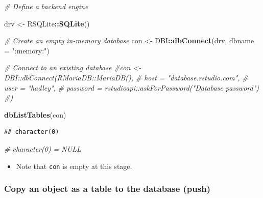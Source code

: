 \documentclass[
]{book}
\newenvironment{Shaded}{\begin{snugshade}}{\end{snugshade}}
\newcommand{\AttributeTok}[1]{\textcolor[rgb]{0.13,0.29,0.53}{#1}}
\newcommand{\CommentTok}[1]{\textcolor[rgb]{0.56,0.35,0.01}{\textit{#1}}}
\newcommand{\FunctionTok}[1]{\textcolor[rgb]{0.13,0.29,0.53}{\textbf{#1}}}
\newcommand{\NormalTok}[1]{#1}
\newcommand{\OtherTok}[1]{\textcolor[rgb]{0.56,0.35,0.01}{#1}}
\newcommand{\SpecialCharTok}[1]{\textcolor[rgb]{0.81,0.36,0.00}{\textbf{#1}}}
\newcommand{\StringTok}[1]{\textcolor[rgb]{0.31,0.60,0.02}{#1}}
\providecommand{\tightlist}{%
  \setlength{\itemsep}{0pt}\setlength{\parskip}{0pt}}
\begin{document}
\begin{Shaded}
\begin{Highlighting}[]
\CommentTok{\# Define a backend engine }

\NormalTok{drv }\OtherTok{\textless{}{-}}\NormalTok{ RSQLite}\SpecialCharTok{::}\FunctionTok{SQLite}\NormalTok{()}

\CommentTok{\# Create an empty in{-}memory database }
\NormalTok{con }\OtherTok{\textless{}{-}}\NormalTok{ DBI}\SpecialCharTok{::}\FunctionTok{dbConnect}\NormalTok{(drv, }
                      \AttributeTok{dbname =} \StringTok{":memory:"}\NormalTok{)}

\CommentTok{\# Connect to an existing database }
\CommentTok{\#con \textless{}{-} DBI::dbConnect(RMariaDB::MariaDB(), }
 \CommentTok{\# host = "database.rstudio.com",}
 \CommentTok{\# user = "hadley",}
 \CommentTok{\# password = rstudioapi::askForPassword("Database password")}
\CommentTok{\#)}

\FunctionTok{dbListTables}\NormalTok{(con)}
\end{Highlighting}
\end{Shaded}

\begin{verbatim}
## character(0)
\end{verbatim}

\begin{Shaded}
\begin{Highlighting}[]
\CommentTok{\# character(0) = NULL}
\end{Highlighting}
\end{Shaded}

\begin{itemize}
\tightlist
\item
  Note that \texttt{con} is empty at this stage.
\end{itemize}

\subsubsection{Copy an object as a table to the database (push)}\label{copy-an-object-as-a-table-to-the-database-push}
\end{document}
